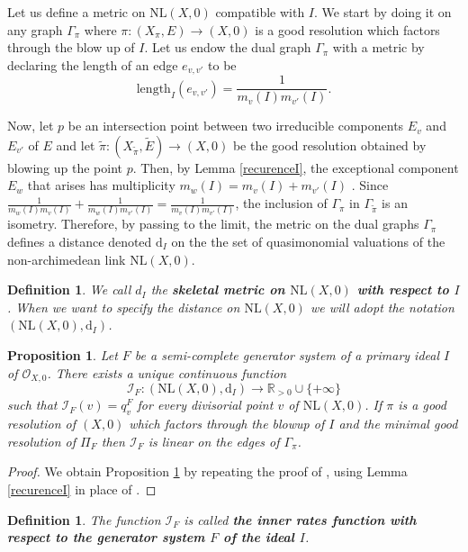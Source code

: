 \documentclass[reqno,dvipsnames,12pt]{amsart}
\newtheorem{prop}[thm]{Proposition}
\newtheorem{defi}[thm]{Definition}
\begin{document}
  
  

 Let us  define a metric on $\mathrm{NL}(X,0)$ compatible with $I$. We start by doing it on any graph $\Gamma_{\pi}$ where $\pi:(X_{\pi},E) \longrightarrow (X,0)$ is a good resolution which factors through the blow up of $I$.  Let us endow the dual graph  $\Gamma_{\pi}$ with a metric by declaring the length of an edge $e_{v,v'}$ to be\begin{equation*}\mathrm{length}_I(e_{v,v'})=\frac{1}{m_v(I)m_{v'}(I)}.\end{equation*}


Now, let $p$ be an intersection  point between two irreducible components  $E_v$ and $E_{v'}$ of $E$ and let $\widetilde{\pi}:(X_{\widetilde{\pi}},\widetilde{E}) \longrightarrow (X,0)$ be the good resolution obtained by blowing up the point $p$. Then, by Lemma \ref{recurenceI}, the exceptional component $E_w$ that arises has multiplicity $m_w(I)=m_v(I)+m_{v'}(I)$ . Since $\frac{1}{m_w(I)m_v(I)}+\frac{1}{m_w(I)m_{v'}(I)}=\frac{1}{m_v(I)m_{v'}(I)}$,  the inclusion of $\Gamma_{\pi}$ in $\Gamma_{\widetilde{\pi}}$ is an isometry. Therefore, by passing to the limit, the metric on the dual graphs $\Gamma_{\pi}$  defines a distance denoted $\mathrm{d}_{I}$ on the the set of quasimonomial valuations of the  non-archimedean link $\mathrm{NL}(X,0)$. 

\begin{defi}\label{skeletalmetricofI}
We call $d_I$ the \textbf{skeletal metric on $\mathrm{NL}(X,0)$ with respect to $I$}. When we want to specify the distance on $\mathrm{NL}(X,0)$ we will adopt the notation $(\mathrm{NL}(X,0),\mathrm{d}_{I})$.
\end{defi}
\begin{prop}\label{inner-rate functionI} Let $F$ be a semi-complete generator system of a primary ideal $I$ of $\mathcal{O}_{X,0}$. There exists a unique continuous function  $$ \mathcal{I}_{F} : (\mathrm{NL}(X,0),\mathrm{d}_I) \longrightarrow \mathbb{R}_{>0} \cup \{ +\infty  \} $$ such that $\mathcal{I}_F(v)=q_{v}^{F}$  for every divisorial point $v$ of $\mathrm{NL}(X,0)$. If $\pi$ is a good resolution of $(X,0)$ which factors through the blowup of $I$ and the minimal good resolution of $\Pi_F$ then $\mathcal{I}_{F}$ is  linear on the edges of $\Gamma_{\pi}$.\end{prop}
\begin{proof}
We obtain Proposition \ref{inner-rate functionI} by repeating the proof of \cite[Lemma 3.8]{BFP}, using Lemma \ref{recurenceI} in place of \cite[Lemma 3.6]{BFP}.
\end{proof}
\begin{defi}
The function $\mathcal{I}_F$ is called \textbf{the inner rates function with respect to the generator system $F$ of the ideal $I$}.
\end{defi}
\end{document}
